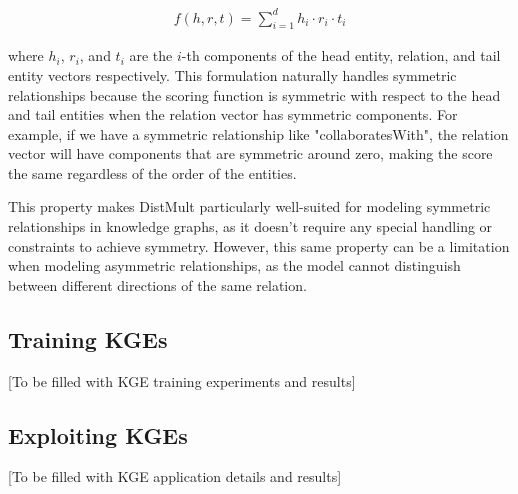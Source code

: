 \documentclass[10pt,a4paper]{article}
\begin{document}
\begin{align*}
    f(h, r, t) = \sum_{i=1}^d h_i \cdot r_i \cdot t_i
\end{align*}

where $h_i$, $r_i$, and $t_i$ are the $i$-th components of the head entity, relation, and tail entity vectors respectively. This formulation naturally handles symmetric relationships because the scoring function is symmetric with respect to the head and tail entities when the relation vector has symmetric components. For example, if we have a symmetric relationship like "collaboratesWith", the relation vector will have components that are symmetric around zero, making the score the same regardless of the order of the entities.

This property makes DistMult particularly well-suited for modeling symmetric relationships in knowledge graphs, as it doesn't require any special handling or constraints to achieve symmetry. However, this same property can be a limitation when modeling asymmetric relationships, as the model cannot distinguish between different directions of the same relation.

\subsection{Training KGEs}
[To be filled with KGE training experiments and results]

\subsection{Exploiting KGEs}
[To be filled with KGE application details and results]
\end{document}
